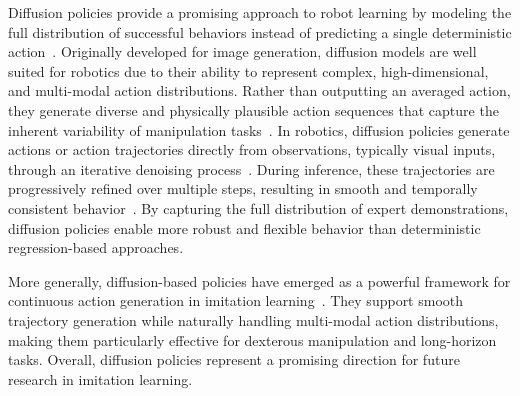 Diffusion policies provide a promising approach to robot learning by modeling the full distribution of successful behaviors instead of predicting a single deterministic action~\cite{Wolf2025DiffusionMF}. Originally developed for image generation, diffusion models are well suited for robotics due to their ability to represent complex, high-dimensional, and multi-modal action distributions. Rather than outputting an averaged action, they generate diverse and physically plausible action sequences that capture the inherent variability of manipulation tasks~\cite{parabRiseDiffusionModels2024a}.
In robotics, diffusion policies generate actions or action trajectories directly from observations, typically visual inputs, through an iterative denoising process~\cite{parabRiseDiffusionModels2024a}. During inference, these trajectories are progressively refined over multiple steps, resulting in smooth and temporally consistent behavior~\cite{Ingelhag2024ARS}. By capturing the full distribution of expert demonstrations, diffusion policies enable more robust and flexible behavior than deterministic regression-based approaches.

More generally, diffusion-based policies have emerged as a powerful framework for continuous action generation in imitation learning~\cite{Li2024CogACTAF, Liu2024RDT1BAD, McCarthy_2025}. They support smooth trajectory generation while naturally handling multi-modal action distributions, making them particularly effective for dexterous manipulation and long-horizon tasks. Overall, diffusion policies represent a promising direction for future research in imitation learning.




